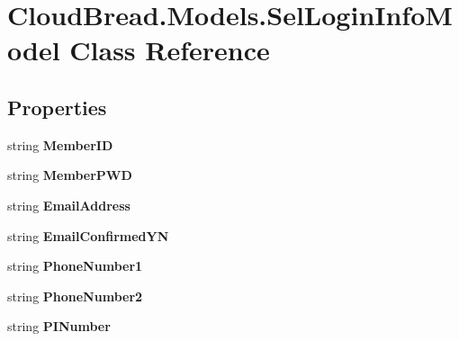 \hypertarget{a00097}{}\section{Cloud\+Bread.\+Models.\+Sel\+Login\+Info\+Model Class Reference}
\label{a00097}
\subsection*{Properties}
\begin{DoxyCompactItemize}
\item 
string {\bfseries Member\+ID}\hypertarget{a00097_a0553755eb11ace1f2a821085993cc46c}{}\label{a00097_a0553755eb11ace1f2a821085993cc46c}

\item 
string {\bfseries Member\+P\+WD}\hypertarget{a00097_a9b2e01bdd29277ba57efe99308ac4bfc}{}\label{a00097_a9b2e01bdd29277ba57efe99308ac4bfc}

\item 
string {\bfseries Email\+Address}\hypertarget{a00097_ae7ff33c5a0c86b2d5f2a3040e00ed8df}{}\label{a00097_ae7ff33c5a0c86b2d5f2a3040e00ed8df}

\item 
string {\bfseries Email\+Confirmed\+YN}\hypertarget{a00097_a0aeb823b334a90226a99a0332b27b852}{}\label{a00097_a0aeb823b334a90226a99a0332b27b852}

\item 
string {\bfseries Phone\+Number1}\hypertarget{a00097_a7a46683c70a091c34ee4309ebb0dbceb}{}\label{a00097_a7a46683c70a091c34ee4309ebb0dbceb}

\item 
string {\bfseries Phone\+Number2}\hypertarget{a00097_ad570a8e9b4e834023a587457bdf815f5}{}\label{a00097_ad570a8e9b4e834023a587457bdf815f5}

\item 
string {\bfseries P\+I\+Number}\hypertarget{a00097_a779a299665336e1cb431e0745dceeafc}{}\label{a00097_a779a299665336e1cb431e0745dceeafc}


\end{DoxyCompactItemize}
